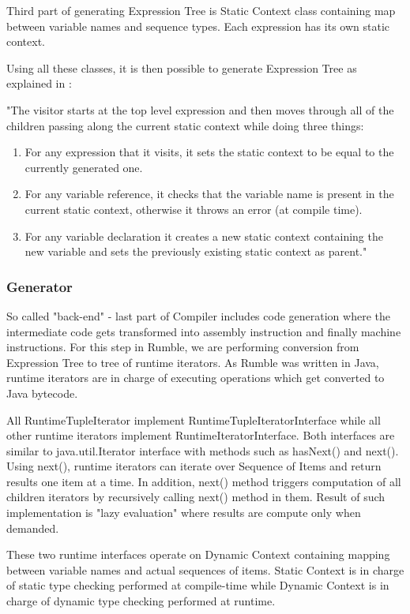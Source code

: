 Third part of generating Expression Tree is Static Context class containing map between variable names and sequence types. Each expression has its own static context.

Using all these classes, it is then possible to generate Expression Tree as explained in \cite{RumbleThesis}: 

"The visitor starts at the top level expression and then moves through all of the children passing along the current static context while doing three things:
\begin{enumerate}
	\item For any expression that it visits, it sets the static context to be equal to the currently generated one.
	\item For any variable reference, it checks that the variable name is present in the current static context, otherwise it throws an error (at compile time).
	\item For any variable declaration it creates a new static context containing the new variable and sets the previously existing static context as parent."
\end{enumerate}

\subsubsection{Generator}
\label{sec:Generator}
So called "back-end" - last part of Compiler includes code generation where the intermediate code gets transformed into assembly instruction and finally machine instructions. For this step in Rumble, we are performing conversion from Expression Tree to tree of runtime iterators. As Rumble was written in Java, runtime iterators are in charge of executing operations which get converted to Java bytecode.

All RuntimeTupleIterator implement RuntimeTupleIteratorInterface while all other runtime iterators implement RuntimeIteratorInterface. Both interfaces are similar to java.util.Iterator interface with methods such as hasNext() and next(). Using next(), runtime iterators can iterate over Sequence of Items and return results one item at a time. In addition, next() method triggers computation of all children iterators by recursively calling next() method in them. Result of such implementation is "lazy evaluation" where results are compute only when demanded. 

These two runtime interfaces operate on Dynamic Context containing mapping between variable names and actual sequences of items. Static Context is in charge of static type checking performed at compile-time while Dynamic Context is in charge of dynamic type checking performed at runtime.

